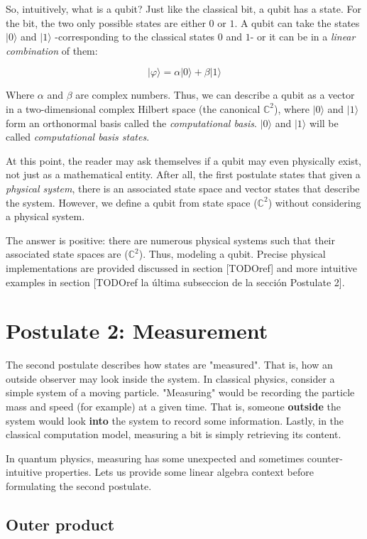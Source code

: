 So, intuitively, what is a qubit? Just like the classical bit, a qubit has a state. For the bit, the two only possible states are either $0$ or $1$. A qubit can take the states $|0\rangle$ and $|1\rangle$ -corresponding to the classical states $0$ and $1$- or it can be in a \emph{linear combination} of them:

$$ |\varphi\rangle = \alpha |0\rangle + \beta |1\rangle $$

Where $\alpha$ and $\beta$ are complex numbers. Thus, we can describe a qubit as a vector in a two-dimensional complex Hilbert space (the canonical $\mathds{C}^{2}$), where $|0\rangle$ and $|1\rangle$ form an orthonormal basis called the \emph{computational basis}. $|0\rangle$ and $|1\rangle$ will be called \emph{computational basis states}.

At this point, the reader may ask themselves if a qubit may even physically exist, not just as a mathematical entity. After all, the first postulate states that given a \emph{physical system}, there is an associated state space and vector states that describe the system. However, we define a qubit from state space ($\mathds{C}^{2}$) without considering a physical system. 

The answer is positive: there are numerous physical systems such that their associated state spaces are ($\mathds{C}^{2}$). Thus, modeling a qubit. Precise physical implementations are provided discussed in section [TODOref] and more intuitive examples in section [TODOref la última subseccion de la sección Postulate 2].


\section{Postulate 2: Measurement}


The second postulate describes how states are "measured". That is, how an outside observer may look inside the system. In classical physics, consider a simple system of a moving particle. "Measuring" would be recording the particle mass and speed (for example) at a given time. That is, someone \textbf{outside} the system would look \textbf{into} the system to record some information. Lastly, in the classical computation model, measuring a bit is simply retrieving its content.

In quantum physics, measuring has some unexpected and sometimes counter-intuitive properties. Lets us provide some linear algebra context before formulating the second postulate.


\subsection{Outer product}


